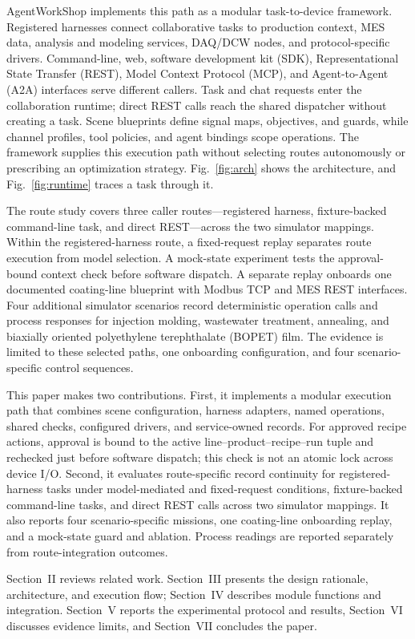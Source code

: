 AgentWorkShop implements this path as a modular task-to-device framework.
Registered harnesses connect collaborative tasks to production context, MES
data, analysis and modeling services, DAQ/DCW nodes, and protocol-specific
drivers. Command-line, web, software development kit (SDK), Representational
State Transfer (REST), Model Context Protocol (MCP), and Agent-to-Agent (A2A)
interfaces serve different callers. Task and chat requests enter the
collaboration runtime; direct REST calls reach the shared dispatcher without
creating a task. Scene blueprints define signal maps, objectives, and guards,
while channel profiles, tool policies, and agent bindings scope operations.
The framework supplies this execution path without selecting routes
autonomously or prescribing an optimization strategy. Fig.~\ref{fig:arch}
shows the architecture, and Fig.~\ref{fig:runtime} traces a task through it.

The route study covers three caller routes---registered harness,
fixture-backed command-line task, and direct REST---across the two simulator
mappings. Within the registered-harness route, a fixed-request replay
separates route execution from model selection. A mock-state experiment tests
the approval-bound context check before software dispatch. A separate replay
onboards one documented coating-line blueprint with Modbus TCP and MES REST
interfaces. Four additional simulator scenarios record deterministic
operation calls and process responses for injection molding, wastewater
treatment, annealing, and biaxially oriented polyethylene terephthalate
(BOPET) film. The evidence is limited to these selected paths, one onboarding
configuration, and four scenario-specific control sequences.

This paper makes two contributions. First, it implements a modular execution
path that combines scene configuration, harness adapters, named operations,
shared checks, configured drivers, and service-owned records. For approved
recipe actions, approval is bound to the active line--product--recipe--run
tuple and rechecked just before software dispatch; this check is not an atomic
lock across device I/O. Second, it evaluates route-specific record continuity
for registered-harness tasks under model-mediated and fixed-request
conditions, fixture-backed command-line tasks, and direct REST calls across
two simulator mappings. It also reports four scenario-specific missions, one
coating-line onboarding replay, and a mock-state guard and ablation. Process
readings are reported separately from route-integration outcomes.

Section~II reviews related work. Section~III presents the design rationale,
architecture, and execution flow; Section~IV describes module functions and
integration. Section~V reports the experimental protocol and results,
Section~VI discusses evidence limits, and Section~VII concludes the paper.
